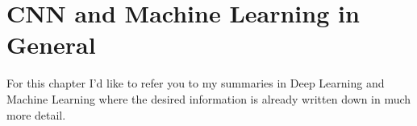 
\section{CNN and Machine Learning in General}

For this chapter I'd like to refer you to my summaries in Deep Learning and Machine Learning where the desired information is already written down in much more detail.

